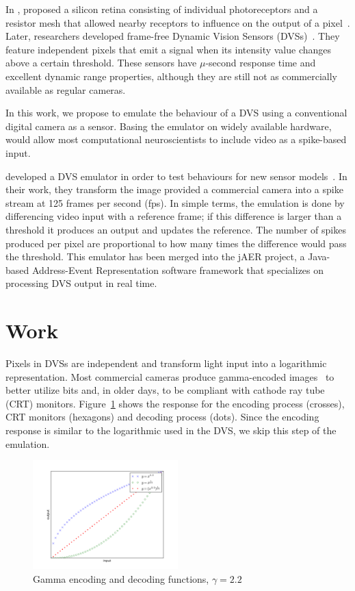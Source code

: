 \documentclass[twocolumn]{article}
\begin{document}
In \citeyear{Mead1989}, \citeauthor{Mead1989} proposed a silicon retina consisting of individual photoreceptors and a resistor mesh that allowed nearby receptors to influence on the output of a pixel~\cite{Mead1989}. 
Later, researchers developed frame-free Dynamic Vision Sensors (DVSs)~\cite{delbruck_dvs,bernabe_dvs}. They feature independent pixels that emit a signal when its intensity value changes above a certain threshold. These sensors have $\mu$-second response time and excellent dynamic range properties, although they are still not as commercially available as regular cameras.

In this work, we propose to emulate the behaviour of a DVS using a conventional digital camera as a sensor. Basing the emulator on widely available hardware, would allow most computational neuroscientists to include video as a spike-based input.


\citeauthor{dvs_emu} developed a DVS emulator in order to test behaviours for new sensor models~\cite{dvs_emu}. In their work, they transform the image provided a commercial camera into a spike stream at 125 frames per second (fps). In simple terms, the emulation is done by differencing video input with a reference frame; if this difference is larger than a threshold it produces an output and updates the reference. The number of spikes produced per pixel are proportional to how many times the difference would pass the threshold. This emulator has been merged into the jAER project, a Java-based Address-Event Representation software framework that specializes on processing DVS output in real time.


\section{Work}

Pixels in DVSs are independent and transform light input into a logarithmic representation. Most commercial cameras produce gamma-encoded images~\cite{Poynton_digital_video} to better utilize bits and, in older days, to be compliant with cathode ray tube (CRT) monitors. Figure~\ref{fig:gamma_coding} shows the response for the encoding process (crosses), CRT monitors (hexagons) and decoding process (dots). Since the encoding response is similar to the logarithmic used in the DVS, we skip this step of the emulation.

\begin{figure}[htb]
  \includegraphics[width=0.5\textwidth]{gamma_coding}

  \caption{Gamma encoding and decoding functions, $\gamma = 2.2$}
  \label{fig:gamma_coding}
\end{figure}
\end{document}
